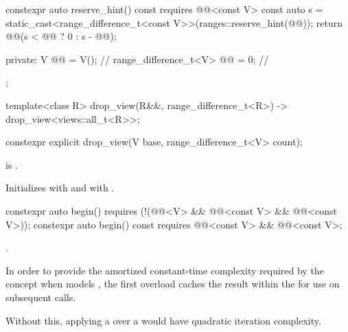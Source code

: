 \begin{codeblock}
{{    constexpr auto reserve_hint() const requires @@<const V> {
      const auto s = static_cast<range_difference_t<const V>>(ranges::reserve_hint(@@));
      return @@(s < @@ ? 0 : s - @@);
    }

  private:
    V @@ = V();                              // \expos
    range_difference_t<V> @@ = 0;           // \expos
  };

  template<class R>
    drop_view(R&&, range_difference_t<R>) -> drop_view<views::all_t<R>>;
}
\end{codeblock}

%
\begin{itemdecl}
constexpr explicit drop_view(V base, range_difference_t<V> count);
\end{itemdecl}

\begin{itemdescr}
\pnum
\expects
{} is .

\pnum
\effects
Initializes  with  and
 with .
\end{itemdescr}

%
\begin{itemdecl}
constexpr auto begin()
  requires (!(@@<V> &&
              @@<const V> && @@<const V>));
constexpr auto begin() const
  requires @@<const V> && @@<const V>;
\end{itemdecl}

\begin{itemdescr}
\pnum
\returns
{}.

\pnum
\remarks
In order to provide the amortized constant-time complexity required
by the  concept
when  models ,
the first overload caches the result within the 
for use on subsequent calls.
\begin{note}
Without this,
applying a  over a 
would have quadratic iteration complexity.
\end{note}
\end{itemdescr}

